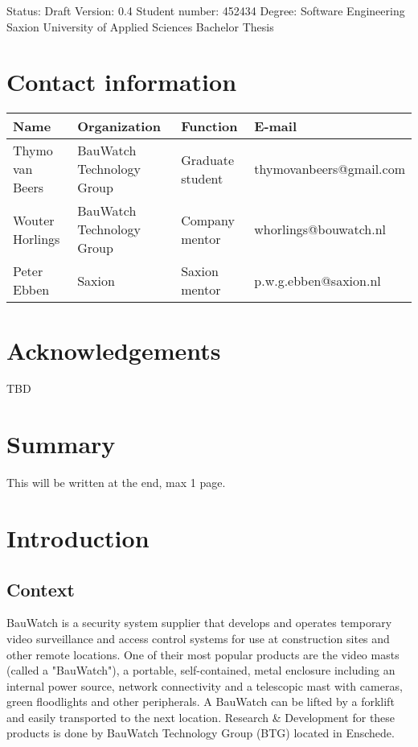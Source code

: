 \begin{titlepage} 
\maketitle
\vspace*{\fill}
Status: Draft
Version: 0.4
Student number: 452434
Degree: Software Engineering
Saxion University of Applied Sciences
Bachelor Thesis
\thispagestyle{empty}
\end{titlepage}

\chapter*{Contact information}
\begin{center}
\begin{tabular}{ | m{8em} | m{8em} | m{8em} | m{11.1em} | }
\hline
\textbf{Name} & \textbf{Organization} & \textbf{Function} & \textbf{E-mail}
\\ \hline
Thymo van Beers & BauWatch Technology Group & Graduate student & thymovanbeers@gmail.com
\\ \hline
Wouter Horlings & BauWatch Technology Group & Company mentor & whorlings@bouwatch.nl
\\ \hline
Peter Ebben & Saxion & Saxion mentor & p.w.g.ebben@saxion.nl
\\ \hline
\end{tabular}
\end{center}
\chapter*{Acknowledgements}
TBD
\thispagestyle{empty}
\chapter*{Summary}
This will be written at the end, max 1 page.
\thispagestyle{empty}

\thispagestyle{empty}
\tableofcontents
\thispagestyle{empty}

\chapter{Introduction}

\section{Context}
BauWatch is a security system supplier that develops and operates temporary video surveillance and access control systems for use at construction sites and other remote locations.
One of their most popular products are the video masts (called a "BauWatch"), a portable, self-contained, metal enclosure including an internal
power source, network connectivity and a telescopic mast with cameras, green floodlights and other peripherals. A BauWatch can be lifted by a forklift and
easily transported to the next location. Research \& Development for these products is done by BauWatch Technology Group (BTG) located in Enschede.


